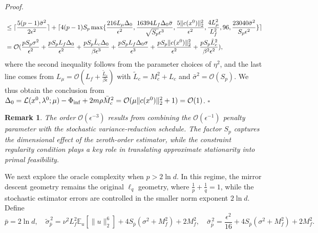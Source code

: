 \documentclass[11pt]{article}
\newtheorem{remark}{Remark}[section]
\newenvironment{proof}[1][Proof]{%
    \par\noindent\textit{#1.}\enspace
  }{%
    \hfill\ensuremath{\square}\par
  }%
\numberwithin{equation}{section}
\newcommand{\E}{\mathbb{E}}
\begin{document}
\begin{proof}
\begin{align}
&\leq \lceil\frac{5(p-1)\bar \sigma^2}{2\epsilon^2}\rceil + \lceil4(p-1)S_p\max \{\frac{216L_\mu\Delta_0}{\epsilon^2}, \frac{16394L_f\Delta_0\bar \sigma}{\sqrt{S_p}\epsilon^3}, \frac{5\|c(x^0)\|_2^2}{\epsilon^2},\frac{4L_\mu^2}{L_f^2}, 96, \frac{23040\bar \sigma^2}{S_p \epsilon^2}\}\rceil\notag \\
&= \mathcal{O}( \frac{pS_p\sigma^2}{\epsilon^2} + \frac{pS_pL_f\Delta_0}{\epsilon^2} + \frac{pS_p\tilde L_c\Delta_0}{\beta\epsilon^3} + \frac{pS_pL_f\Delta_0\sigma}{\epsilon^3}+\frac{pS_p\|c(x^0)\|_2^2}{\epsilon^2} + \frac{pS_p\tilde L_c^2}{\beta^2\epsilon^2}),\label{eq:complexity}
\end{align}
where the second inequality follows from the parameter choices of $\eta^2$, and the last line comes from $L_\mu = \mathcal O(L_f+\frac{\tilde L_c}{\beta \epsilon})$ with $\tilde L_c = M_c^2 + L_c$ and $\bar \sigma^2 = \mathcal O(S_p)$. We thus obtain the conclusion from  \(\Delta_0 = \mathcal L(x^0,\lambda^0;\mu) - \Phi_{\rm inf} + 2m\rho \bar{M}_c^2 = \mathcal O (\mu \|c(x^0)\|_2^2+1) = \mathcal O(1)\).
\end{proof}


\begin{remark}
The order \(\mathcal O(\epsilon^{-3})\) results from combining the
\(\mathcal O(\epsilon^{-1})\) penalty parameter with the stochastic
variance-reduction schedule.  The factor \(S_p\) captures the dimensional
effect of the zeroth-order estimator, while the constraint regularity condition plays a key role in translating approximate stationarity into primal feasibility.
\end{remark}



We next explore the oracle complexity when \(p > 2\ln d\). 
In this regime, the mirror descent geometry remains the original \(\ell_q\) geometry, where \(\frac{1}{p}+\frac{1}{q}=1\), while the stochastic estimator errors are controlled in the smaller norm exponent \(2\ln d\). Define
\[\bar p=2\ln d,\quad \tilde \sigma_{\bar p}^{\,2} = 
\nu^2 L_f^2 \E_u[\|u\|_2^6]+4 S_{\bar p} (\sigma^2+M_f^2)+ 2M_f^2,\quad 
\bar\sigma_{\bar p}^{\,2}
=\frac{\epsilon^2}{16}
+4S_{\bar p}(\sigma^2+M_f^2)+2M_f^2.
\]  %
\end{document}
